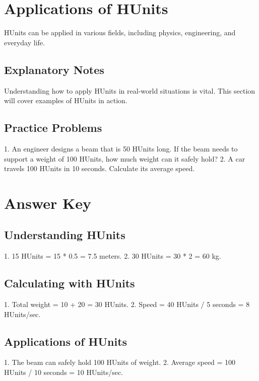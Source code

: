 \documentclass{article}
\begin{document}
\section*{Applications of HUnits}
HUnits can be applied in various fields, including physics, engineering, and everyday life. 

\subsection*{Explanatory Notes}
Understanding how to apply HUnits in real-world situations is vital. This section will cover examples of HUnits in action.

\subsection*{Practice Problems}
1. An engineer designs a beam that is 50 HUnits long. If the beam needs to support a weight of 100 HUnits, how much weight can it safely hold?
2. A car travels 100 HUnits in 10 seconds. Calculate its average speed.

\section*{Answer Key}
\subsection*{Understanding HUnits}
1. 15 HUnits = 15 * 0.5 = 7.5 meters.
2. 30 HUnits = 30 * 2 = 60 kg.

\subsection*{Calculating with HUnits}
1. Total weight = 10 + 20 = 30 HUnits.
2. Speed = 40 HUnits / 5 seconds = 8 HUnits/sec.

\subsection*{Applications of HUnits}
1. The beam can safely hold 100 HUnits of weight.
2. Average speed = 100 HUnits / 10 seconds = 10 HUnits/sec.
\end{document}
